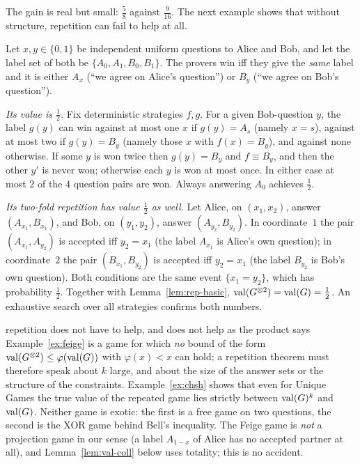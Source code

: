 \noindent
The gain is real but small: $\frac58$ against $\frac9{16}$.  The next example shows that without structure, repetition can fail to help at all.

\begin{example}\label{ex:feige}
Let $x,y\in\{0,1\}$ be independent uniform questions to Alice and Bob, and let the label set of both be $\{A_0,A_1,B_0,B_1\}$.  The provers win iff they give the \emph{same} label and it is either $A_x$ (``we agree on Alice's question'') or $B_y$ (``we agree on Bob's question'').

\emph{Its value is $\frac12$.}  Fix deterministic strategies $f,g$.  For a given Bob-question $y$, the label $g(y)$ can win against at most one $x$ if $g(y)=A_s$ (namely $x=s$), against at most two if $g(y)=B_y$ (namely those $x$ with $f(x)=B_y$), and against none otherwise.
If some $y$ is won twice then $g(y)=B_y$ and $f\equiv B_y$, and then the other $y'$ is never won; otherwise each $y$ is won at most once.  In either case at most $2$ of the $4$ question pairs are won.  Always answering $A_0$ achieves $\frac12$.

\emph{Its two-fold repetition has value $\frac12$ as well.}  Let Alice, on $(x_1,x_2)$, answer $(A_{x_1},B_{x_1})$, and Bob, on $(y_1,y_2)$, answer $(A_{y_2},B_{y_2})$.  In coordinate~$1$ the pair $(A_{x_1},A_{y_2})$ is accepted iff $y_2=x_1$ (the label $A_{x_1}$ is Alice's own question); in coordinate~$2$ the pair $(B_{x_1},B_{y_2})$ is accepted iff $y_2=x_1$ (the label $B_{y_2}$ is Bob's own question).  Both conditions are the same event $\{x_1=y_2\}$, which has probability $\frac12$.
Together with Lemma~\ref{lem:rep-basic}, $\operatorname{val}(G^{\otimes2})=\operatorname{val}(G)=\frac12$.  An exhaustive search over all strategies confirms both numbers.
\end{example}

\begin{pitfall}{repetition does not have to help, and does not help as the product says}
Example~\ref{ex:feige} is a game for which \emph{no} bound of the form $\operatorname{val}(G^{\otimes2})\le\varphi(\operatorname{val}(G))$ with $\varphi(x)<x$ can hold; a repetition theorem must therefore speak about $k$ large, and about the size of the answer sets or the structure of the constraints.
Example~\ref{ex:chsh} shows that even for Unique Games the true value of the repeated game lies strictly between $\operatorname{val}(G)^k$ and $\operatorname{val}(G)$.  Neither game is exotic: the first is a free game on two questions, the second is the XOR game behind Bell's inequality.
The Feige game is \emph{not} a projection game in our sense (a label $A_{1-x}$ of Alice has no accepted partner at all), and Lemma~\ref{lem:val-coll} below uses totality; this is no accident.
\end{pitfall}

